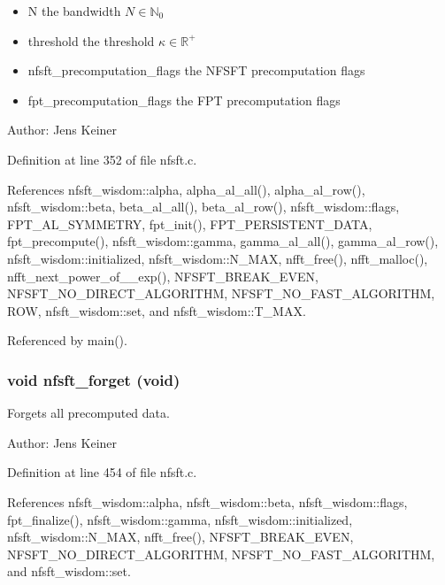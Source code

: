 \begin{itemize}
\item N the bandwidth $N \in \mathbb{N}_0$ \item threshold the threshold $\kappa \in \mathbb{R}^{+}$ \item nfsft\_\-precomputation\_\-flags the NFSFT precomputation flags \item fpt\_\-precomputation\_\-flags the FPT precomputation flags\end{itemize}
\begin{Desc}
\item[Author:]Jens Keiner \end{Desc}


Definition at line 352 of file nfsft.c.

References nfsft\_\-wisdom::alpha, alpha\_\-al\_\-all(), alpha\_\-al\_\-row(), nfsft\_\-wisdom::beta, beta\_\-al\_\-all(), beta\_\-al\_\-row(), nfsft\_\-wisdom::flags, FPT\_\-AL\_\-SYMMETRY, fpt\_\-init(), FPT\_\-PERSISTENT\_\-DATA, fpt\_\-precompute(), nfsft\_\-wisdom::gamma, gamma\_\-al\_\-all(), gamma\_\-al\_\-row(), nfsft\_\-wisdom::initialized, nfsft\_\-wisdom::N\_\-MAX, nfft\_\-free(), nfft\_\-malloc(), nfft\_\-next\_\-power\_\-of\_\_\-exp(), NFSFT\_\-BREAK\_\-EVEN, NFSFT\_\-NO\_\-DIRECT\_\-ALGORITHM, NFSFT\_\-NO\_\-FAST\_\-ALGORITHM, ROW, nfsft\_\-wisdom::set, and nfsft\_\-wisdom::T\_\-MAX.

Referenced by main().\hypertarget{group__nfsft_g3b69bca6c76a63877534f5a9781bf285}{
\subsubsection{\setlength{\rightskip}{0pt plus 5cm}void nfsft\_\-forget (void)}}
\label{group__nfsft_g3b69bca6c76a63877534f5a9781bf285}


Forgets all precomputed data. 

\begin{Desc}
\item[Author:]Jens Keiner \end{Desc}


Definition at line 454 of file nfsft.c.

References nfsft\_\-wisdom::alpha, nfsft\_\-wisdom::beta, nfsft\_\-wisdom::flags, fpt\_\-finalize(), nfsft\_\-wisdom::gamma, nfsft\_\-wisdom::initialized, nfsft\_\-wisdom::N\_\-MAX, nfft\_\-free(), NFSFT\_\-BREAK\_\-EVEN, NFSFT\_\-NO\_\-DIRECT\_\-ALGORITHM, NFSFT\_\-NO\_\-FAST\_\-ALGORITHM, and nfsft\_\-wisdom::set.

